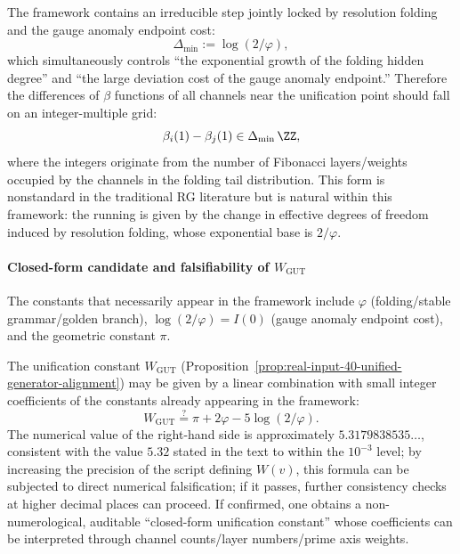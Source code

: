 \begin{proposition}\label{prop:beta-quantization-step}
The framework contains an irreducible step jointly locked by resolution folding and the gauge anomaly endpoint cost:
\[
\Delta_{\min}:=\log(2/\varphi),
\]
which simultaneously controls ``the exponential growth of the folding hidden degree'' and ``the large deviation cost of the gauge anomaly endpoint.'' Therefore the differences of \(\beta\) functions of all channels near the unification point should fall on an integer-multiple grid:
\[
\beta_i(1)-\beta_j(1)\in \Delta_{\min}\,\ZZ,
\]
where the integers originate from the number of Fibonacci layers/weights occupied by the channels in the folding tail distribution. This form is nonstandard in the traditional RG literature but is natural within this framework: the running is given by the change in effective degrees of freedom induced by resolution folding, whose exponential base is \(2/\varphi\).
\end{proposition}

\paragraph{Closed-form candidate and falsifiability of \(W_{\mathrm{GUT}}\)}
The constants that necessarily appear in the framework include \(\varphi\) (folding/stable grammar/golden branch), \(\log(2/\varphi)=I(0)\) (gauge anomaly endpoint cost), and the geometric constant \(\pi\).

\begin{conjecture}\label{conj:Wgut-closed-form}
The unification constant \(W_{\mathrm{GUT}}\) (Proposition~\ref{prop:real-input-40-unified-generator-alignment}) may be given by a linear combination with small integer coefficients of the constants already appearing in the framework:
\[
W_{\mathrm{GUT}}\stackrel{?}{=}\pi+2\varphi-5\log(2/\varphi).
\]
The numerical value of the right-hand side is approximately \(5.3179838535\ldots\), consistent with the value \(5.32\) stated in the text to within the \(10^{-3}\) level; by increasing the precision of the script defining \(W(v)\), this formula can be subjected to direct numerical falsification; if it passes, further consistency checks at higher decimal places can proceed. If confirmed, one obtains a non-numerological, auditable ``closed-form unification constant'' whose coefficients can be interpreted through channel counts/layer numbers/prime axis weights.
\end{conjecture}


